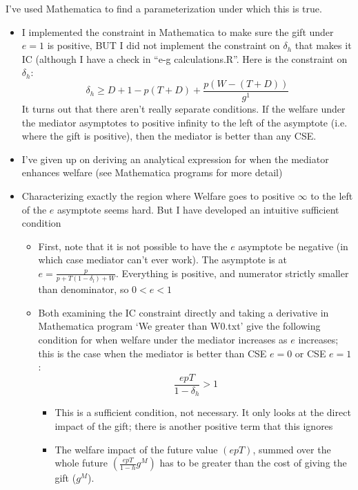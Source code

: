 \documentclass[12pt]{article}
\newcommand{\de}{\delta}
\begin{document}
I've used Mathematica to find a parameterization under which this is true.
\begin{itemize}
	\item I implemented the constraint in Mathematica to make sure the gift under $e=1$ is positive, BUT I did not implement the constraint on $\de_h$ that makes it IC (although I have a check in ``e-g calculations.R''. Here is the constraint on $\de_h$:
		\[
		  \de_h \geq D + 1 - p(T+D) + \frac{p(W-(T+D))}{g^1}
		\]
It turns out that there aren't really separate conditions. If the welfare under the mediator asymptotes to positive infinity to the left of the asymptote (i.e. where the gift is positive), then the mediator is better than any CSE.
					\item I've given up on deriving an analytical expression for when the mediator enhances welfare (see Mathematica programs for more detail)
					\item Characterizing exactly the region where Welfare goes to positive $\infty$ to the left of the $e$ asymptote seems hard. But I have developed an intuitive sufficient condition
								\begin{itemize}
									\item First, note that it is not possible to have the $e$ asymptote be negative (in which case mediator can't ever work). The asymptote is at $e=\frac{p}{p + T(1-\de_l) +W}$. Everything is positive, and numerator strictly smaller than denominator, so $0 < e < 1$
									\item Both examining the IC constraint directly and taking a derivative in Mathematica program `We greater than W0.txt' give the following condition for when welfare under the mediator increases as $e$ increases; this is the case when the mediator is better than CSE $e=0$ or CSE $e=1$:
										\[
											\frac{e p T}{1 - \de_h} > 1
										\]
										\begin{itemize}
											\item This is a sufficient condition, not necessary. It only looks at the direct impact of the gift; there is another positive term that this ignores
											\item The welfare impact of the future value $(epT)$, summed over the whole future $\left(\frac{e p T}{1-h}g^M\right)$ has to be greater than the cost of giving the gift ($g^M$). 
										\end{itemize}
								\end{itemize}
\end{itemize}
\end{document}
